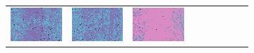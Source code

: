 \documentclass{ipol}
\begin{document}
\begin{figure}[ht]
\begin{subfigure}[t]{\linewidth}
\begin{tabular}{ccccccccc}
                \includegraphics[width=\s]{images/lake/AHD/bid_med_64_grids.png}&
                \includegraphics[width=\s]{images/lake/DCB/bid_med_64_grids.png}&
                \includegraphics[width=\s]{images/lake/DHT/bid_med_64_grids.png}&

\end{tabular}
\end{subfigure}
\end{figure}
\end{document}
